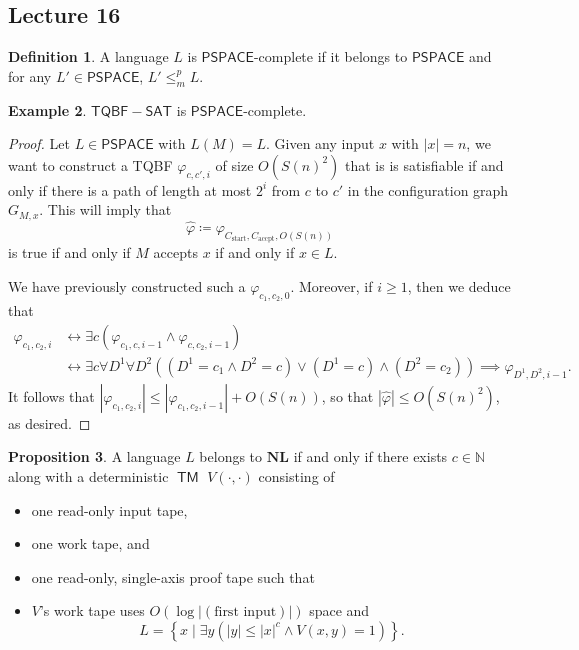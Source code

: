 \documentclass[10pt,letterpaper,cm]{nupset}
\theoremstyle{definition}
\newtheorem{definition}{Definition}[subsection]
\newtheorem{exmp}[definition]{Example}
\theoremstyle{theorem}
\newtheorem{prop}[definition]{Proposition}
\theoremstyle{remark}
\newcommand{\N}{\mathbb N}
\newcommand{\1}{\mathbf{1}}
\newcommand{\accpt}{\mathrm{accpt}}
\newcommand{\0}{\vec 0}
\DeclareMathOperator{\TM}{\mathsf{TM}}
\begin{document}
\subsection{Lecture 16}

\begin{definition}
A language $L$ is $\mathsf{PSPACE}$-complete if it belongs to $\mathsf{PSPACE}$ and for any $L' \in \mathsf{PSPACE}$, $L' \leq_m^p L$.
\end{definition}

\begin{exmp}
$\mathsf{TQBF{-}SAT} $ is $\mathsf{PSPACE}$-complete.
\end{exmp}
\begin{proof}
Let $L \in \mathsf{PSPACE}$ with $L(M) = L$. Given any input $x$ with $\left\lvert{x}\right\rvert =n$, we want to construct a TQBF $\varphi_{c, c', i}$ of size $O\left(S(n)^2\right)$ that is is satisfiable if and only if there is a path of length at most $2^i$ from $c$ to $c'$ in the configuration graph $G_{M,x}$. This will imply that $$\hat{\varphi}\coloneqq \varphi_{C_{\mathrm{start}}, C_{\accpt}, O(S(n))}$$ is true if and only if $M$ accepts $x$ if and only if $x\in L$.


 We have previously constructed such a $\varphi_{c_1, c_2, 0}$. Moreover, if $i\geq 1$, then we deduce that 
\begin{align*}
\varphi_{c_1, c_2, i} & \leftrightarrow \exists c\left(\varphi_{c_1, c, i-1} \land \varphi_{c, c_2, i-1}\right)
\\ & \leftrightarrow \exists c \forall D^1 \forall D^2\left(\left(D^1 = c_1 \land D^2 = c\right) \vee \left(D^1 = c\right) \land \left(D^2 = c_2\right)\right) \implies \varphi_{D^1, D^2, i-1}.
\end{align*}
It follows that $\left\lvert{\varphi_{c_1, c_2, i}}\right\rvert\leq \left\lvert{\varphi_{c_1, c_2, i-1}}\right\rvert +O(S(n))$, so that $\left\lvert{\hat{\varphi}}\right\rvert \leq O\left(S(n)^2\right)$, as desired.
\end{proof}

\begin{prop}
A language $L$ belongs to $\mathbf{NL}$ if and only if there exists $c\in \N$ along with a deterministic $\TM$ $V(\cdot, \cdot)$ consisting of 
\begin{itemize}
\item one read-only input tape, 
\item one work tape, and 
\item one read-only, single-axis proof tape  such that 
\item $V$'s work tape uses $O\left(\log{\left\lvert{\left(\text{first input}\right)}\right\rvert}\right)$ space and $$L = \left\{ x \mid \exists y\left(\left\lvert{y}\right\rvert \leq \left\lvert{x}\right\rvert^{c} \land V\left(x,y\right) = 1\right)\right\}.$$ 
\end{itemize}
\end{prop}
\end{document}
